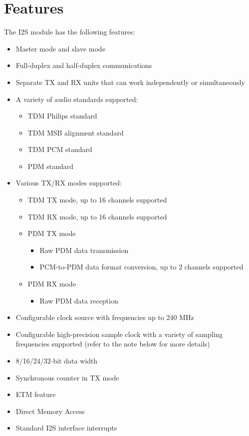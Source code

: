 \documentclass[main\_\_EN.tex]{subfiles}
\begin{document}
\section{Features}

The I2S module has the following features:

\begin{itemize}
    \item Master mode and slave mode
    \item Full-duplex and half-duplex communications
    \item Separate TX and RX units that can work independently or simultaneously
    \item A variety of audio standards supported: 
        \begin{itemize}
            \item TDM Philips standard
            \item TDM MSB alignment standard
            \item TDM PCM standard
            \item PDM standard
        \end{itemize}
    \item Various TX/RX modes supported:
        \begin{itemize}
        \item TDM TX mode, up to 16 channels supported
        \item TDM RX mode, up to 16 channels supported
        \item PDM TX mode
        \begin{itemize}
            \item Raw PDM data transmission
            \item PCM-to-PDM data format conversion, up to 2 channels supported
        \end{itemize}
        \item PDM RX mode
        \begin{itemize}
            \item Raw PDM data reception
        \end{itemize}
        \end{itemize}
    \item Configurable clock source with frequencies up to 240 MHz
    \item Configurable high-precision sample clock with a variety of sampling frequencies supported (refer to the note below for more details)
    \item 8/16/24/32-bit data width
    \item Synchronous counter in TX mode
    \item ETM feature
    \item Direct Memory Access
    \item Standard I2S interface interrupts 
\end{itemize}
\end{document}
